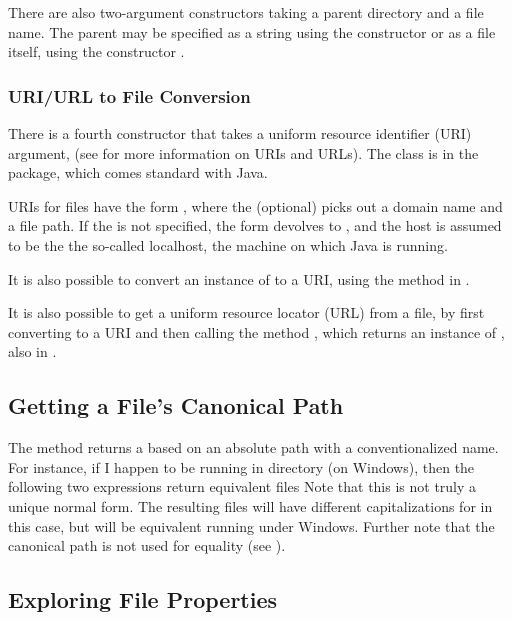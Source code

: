 There are also two-argument constructors taking a parent directory and
a file name.  The parent may be specified as a string using the constructor
 or as a file itself, using the constructor
.

\subsubsection{URI/URL to File Conversion}

There is a fourth  constructor that takes a uniform
resource identifier (URI) argument,  (see
 for more information on URIs and URLs).  The
 class is in the  package, which comes
standard with Java.

URIs for files have the form
\code{/}, where the
(optional)  picks out a domain name and  a
file path.  If the  is not specified, the form devolves
to , and the host is assumed to be the
the so-called localhost, the machine on which Java is running.

It is also possible to convert an instance of  to a URI,
using the method  in .  

It is also possible to get a uniform resource locator (URL) from a
file, by first converting to a URI and then calling the 
method , which returns an instance of , also
in .



\subsection{Getting a File's Canonical Path}

The method  returns a  based on an
absolute path with a conventionalized name.  For instance, if I happen
to be running in directory  (on Windows), then the
following two expressions return equivalent files
%
%
%
Note that this is not truly a unique normal form.  The resulting files
will have different capitalizations for  in this case, but
will be equivalent running under Windows.  Further note that the
canonical path is not used for equality (see ).


\subsection{Exploring File Properties}

